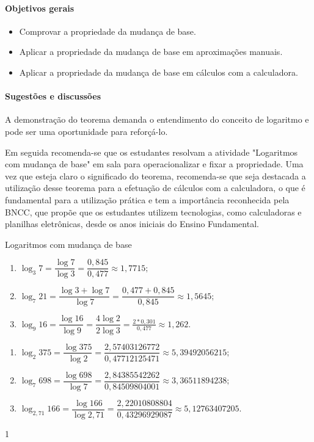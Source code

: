 \clearpage\def\currentcolor{session4}
\begin{texto}
{
	\paragraph{Objetivos gerais}
	\begin{itemize}
	\item Comprovar a propriedade da mudança de base.
	\item Aplicar a propriedade da mudança de base em aproximações manuais.
	\item Aplicar a propriedade da mudança de base em cálculos com a calculadora.
	\end{itemize}

	\paragraph{Sugestões e discussões}
	A demonstração do teorema demanda o entendimento do conceito de logaritmo e pode ser uma oportunidade para reforçá-lo.

	Em seguida recomenda-se que os estudantes resolvam a atividade "Logaritmos com mudança de base" em sala para operacionalizar e fixar a propriedade. Uma vez que esteja claro o significado do teorema, recomenda-se que seja destacada a utilização desse teorema para a efetuação de cálculos com a calculadora, o que é fundamental para a utilização prática e tem a importância reconhecida pela BNCC, que propõe que os estudantes utilizem tecnologias, como calculadoras e planilhas eletrônicas, desde os anos iniciais do Ensino Fundamental. 
}
\end{texto}
\marginpar{\vspace{.5em}}
\begin{answer}{Logaritmos com mudança de base}
{
	\begin{enumerate}
	\item  $\log_3 7=\dfrac{\log 7}{\log 3} = \dfrac{0{,}845}{0{,}477} \approx 1{,}7715;$
	\item  $\log_7 21=\dfrac{\log 3 + \log 7}{\log 7} = \dfrac{0{,}477 + 0{,}845}{0{,}845} \approx 1{,}5645;$
	\item  $\log_9 16=\dfrac{\log 16}{\log 9} =\dfrac{4\log 2}{2\log 3} = \frac{2*0{,}301}{0{,}477} \approx 1{,}262.$
	\end{enumerate}

	\begin{enumerate}
	\item $\log_2 375=\dfrac{\log 375}{\log 2} = \dfrac{2{,}57403126772}{0{,}47712125471} \approx 5{,}39492056215;$
	\item $\log_7 698 =\dfrac{\log 698}{\log 7} = \dfrac{2{,}84385542262}{0{,}84509804001} \approx 3{,}36511894238;$
	\item $\log_{2{,}71} 166 = \dfrac{\log 166}{\log 2{,}71} = \dfrac{2{,}22010808804}{0{,}43296929087} \approx 5{,}12763407205.$
	\end{enumerate}
}{1}
\end{answer}


